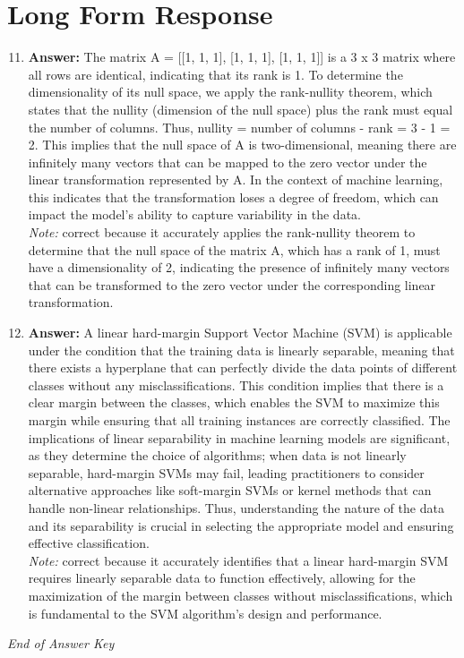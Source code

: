 \documentclass[12pt]{article}
\begin{document}
\section*{Long Form Response}
\begin{enumerate}[label=\arabic*.]
\setcounter{enumi}{10}
\item \textbf{Answer:} The matrix A = [[1, 1, 1], [1, 1, 1], [1, 1, 1]] is a 3 x 3 matrix where all rows are identical, indicating that its rank is 1. To determine the dimensionality of its null space, we apply the rank-nullity theorem, which states that the nullity (dimension of the null space) plus the rank must equal the number of columns. Thus, nullity = number of columns - rank = 3 - 1 = 2. This implies that the null space of A is two-dimensional, meaning there are infinitely many vectors that can be mapped to the zero vector under the linear transformation represented by A. In the context of machine learning, this indicates that the transformation loses a degree of freedom, which can impact the model's ability to capture variability in the data.
\\ \textit{Note:} correct because it accurately applies the rank-nullity theorem to determine that the null space of the matrix A, which has a rank of 1, must have a dimensionality of 2, indicating the presence of infinitely many vectors that can be transformed to the zero vector under the corresponding linear transformation.
\item \textbf{Answer:} A linear hard-margin Support Vector Machine (SVM) is applicable under the condition that the training data is linearly separable, meaning that there exists a hyperplane that can perfectly divide the data points of different classes without any misclassifications. This condition implies that there is a clear margin between the classes, which enables the SVM to maximize this margin while ensuring that all training instances are correctly classified. The implications of linear separability in machine learning models are significant, as they determine the choice of algorithms; when data is not linearly separable, hard-margin SVMs may fail, leading practitioners to consider alternative approaches like soft-margin SVMs or kernel methods that can handle non-linear relationships. Thus, understanding the nature of the data and its separability is crucial in selecting the appropriate model and ensuring effective classification.
\\ \textit{Note:} correct because it accurately identifies that a linear hard-margin SVM requires linearly separable data to function effectively, allowing for the maximization of the margin between classes without misclassifications, which is fundamental to the SVM algorithm's design and performance.
\end{enumerate}

\vfill
\noindent\textit{End of Answer Key}
\end{document}
